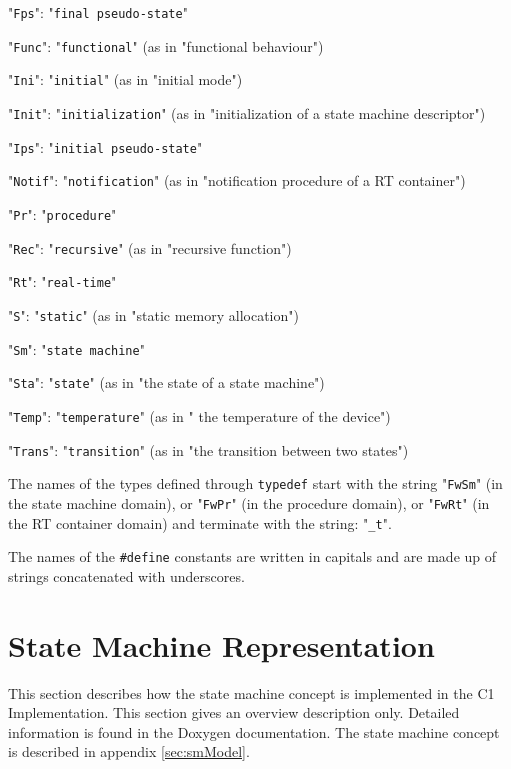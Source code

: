 \documentclass[manual]{../fwprofile}
\begin{document}
\begin{fw_itemize}
\item "\texttt{Fps}": "\texttt{final pseudo-state}"
\item "\texttt{Func}": "\texttt{functional}" (as in "functional behaviour")
\item "\texttt{Ini}": "\texttt{initial}" (as in "initial mode")
\item "\texttt{Init}": "\texttt{initialization}" (as in "initialization of a state machine descriptor")
\item "\texttt{Ips}": "\texttt{initial pseudo-state}"
\item "\texttt{Notif}": "\texttt{notification}" (as in "notification procedure of a RT container")
\item "\texttt{Pr}": "\texttt{procedure}"
\item "\texttt{Rec}": "\texttt{recursive}" (as in "recursive function")
\item "\texttt{Rt}": "\texttt{real-time}" 
\item "\texttt{S}": "\texttt{static}" (as in "static memory allocation")
\item "\texttt{Sm}": "\texttt{state machine}"
\item "\texttt{Sta}": "\texttt{state}" (as in "the state of a state machine")
\item "\texttt{Temp}": "\texttt{temperature}" (as in " the temperature of the device")
\item "\texttt{Trans}": "\texttt{transition}" (as in "the transition between two states")
\end{fw_itemize}

The names of the types defined through \texttt{typedef} start with the string "\texttt{FwSm}" (in
the state machine domain), or "\texttt{FwPr}" (in the procedure domain), or "\texttt{FwRt}" (in the RT container domain) and terminate with the string: "\texttt{\_t}".

The names of the \texttt{\#define} constants are written in capitals and are made 
up of strings concatenated with underscores.



\section{State Machine Representation}
This section describes how the state machine concept is implemented in the C1 Implementation. 
This section gives an overview description only. Detailed information is found in the 
Doxygen documentation. The state machine concept is described in appendix \ref{sec:smModel}.
\end{document}
